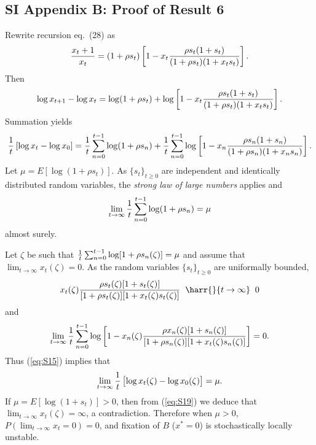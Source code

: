 \documentclass[9pt, a4paper]{extarticle}
\begin{document}
\subsection*{SI Appendix B: Proof of Result 6}

 Rewrite recursion eq.~(28) as
 \begin{equation}
{x_t+1\over x_t} =(1+\rho s_t)\left[1-x_t{\rho s_t(1+s_t)\over (1+\rho s_t)(1+x_ts_t)}\right].
\end{equation}
 Then
 \begin{equation}
\log x_{t+1} -\log x_t =\log(1+\rho s_t) +\log\left[1-x_t{\rho s_t(1+s_t)\over (1+\rho s_t)(1+x_ts_t)}\right].
\end{equation}
 Summation yields
  \begin{equation}
{1\over t}\left[\log x_t-\log x_0\right] ={1\over t}\sum_{n=0}^{t-1}\log(1+\rho s_n) +{1\over t}\sum_{n=0}^{t-1}\log\left[1-x_n{\rho s_n(1+s_n)\over (1+\rho s_n)(1+x_ns_n)}\right].
\label{eq:S15}
 \end{equation}
Let $\mu=E\left[\log(1+\rho s_t)\right]$. As $\{s_t\}_{t\ge 0}$ are independent and identically distributed random variables, the {\sl strong law of large numbers} applies and
 \begin{equation}
\lim_{t\to\infty}{1\over t}\sum_{n=0}^{t-1}\log(1+\rho s_n)=\mu
 \end{equation}
almost surely.

Let $\zeta$ be such that ${1\over t}\sum_{n=0}^{t-1}\log[1+\rho s_n(\zeta)]=\mu$ and assume that $\lim_{t\to\infty}x_t(\zeta)=0$. As the random variables $\{s_t\}_{t\ge 0}$ are uniformally bounded,
 \begin{equation}
x_t(\zeta){\rho s_t(\zeta)[1+s_t(\zeta)]\over [1+\rho s_t(\zeta)][1+x_t(\zeta)s_t(\zeta)]}\;\;\harr{}{t\to\infty}\;\;0
 \end{equation}
and
 \begin{equation}
\lim_{t\to\infty}{1\over t}\sum_{n=0}^{t-1}\log\left[1-x_n(\zeta){\rho x_n(\zeta)[1+s_n(\zeta)]\over [1+\rho s_n(\zeta)][1+x_t(\zeta)s_n(\zeta)]}\right]=0.
 \end{equation}
Thus (\ref{eq:S15}) implies that
 \begin{equation}
\lim_{t\to\infty}{1\over t}\left[\log x_t(\zeta) -\log x_0(\zeta)\right]=\mu.
 \label{eq:S19}
 \end{equation}
If $\mu =E\left[\log(1+s_t)\right]>0$, then from (\ref{eq:S19}) we deduce that $\lim_{t\to\infty}x_t(\zeta)=\infty$, a contradiction.
Therefore when $\mu>0$, $P\left(\lim_{t\to\infty}x_t=0\right)=0$, and fixation of $B$ ($x^*=0$) is stochastically locally unstable.
\end{document}
